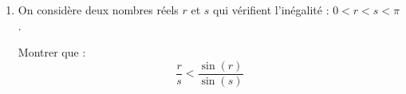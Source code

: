 \begin{enumerate}
\begin{enumerate}
\item En déduire le sens de variation de la fonction $f$ sur l'intervalle $]0~;~2\pi]$.

\item Déterminer la limite de $f$ en $0$. On pourra utiliser le taux d'accroissement de la fonction sinus en $0$.
\end{enumerate}

\item On considère deux nombres réels $r$ et $s$ qui vérifient l'inégalité : $0 < r < s < \pi$.

Montrer que :
\[
\dfrac{r}{s}<\dfrac{\sin(r)}{\sin(s)}
\]
\end{enumerate}
